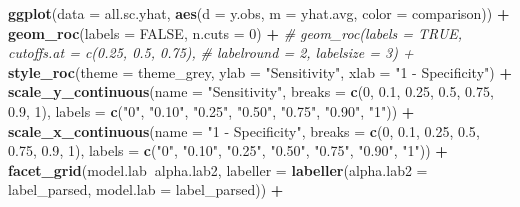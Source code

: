 \documentclass[
]{article}
\newenvironment{Shaded}{\begin{snugshade}}{\end{snugshade}}
\newcommand{\CommentTok}[1]{\textcolor[rgb]{0.56,0.35,0.01}{\textit{#1}}}
\newcommand{\DataTypeTok}[1]{\textcolor[rgb]{0.13,0.29,0.53}{#1}}
\newcommand{\DecValTok}[1]{\textcolor[rgb]{0.00,0.00,0.81}{#1}}
\newcommand{\FloatTok}[1]{\textcolor[rgb]{0.00,0.00,0.81}{#1}}
\newcommand{\KeywordTok}[1]{\textcolor[rgb]{0.13,0.29,0.53}{\textbf{#1}}}
\newcommand{\NormalTok}[1]{#1}
\newcommand{\OperatorTok}[1]{\textcolor[rgb]{0.81,0.36,0.00}{\textbf{#1}}}
\newcommand{\OtherTok}[1]{\textcolor[rgb]{0.56,0.35,0.01}{#1}}
\newcommand{\StringTok}[1]{\textcolor[rgb]{0.31,0.60,0.02}{#1}}
\begin{document}
\begin{Shaded}
\begin{Highlighting}[]
\KeywordTok{ggplot}\NormalTok{(}\DataTypeTok{data =}\NormalTok{ all.sc.yhat, }\KeywordTok{aes}\NormalTok{(}\DataTypeTok{d =}\NormalTok{ y.obs, }\DataTypeTok{m =}\NormalTok{ yhat.avg, }\DataTypeTok{color =}\NormalTok{ comparison)) }\OperatorTok{+}
\StringTok{  }\KeywordTok{geom_roc}\NormalTok{(}\DataTypeTok{labels =} \OtherTok{FALSE}\NormalTok{, }\DataTypeTok{n.cuts =} \DecValTok{0}\NormalTok{) }\OperatorTok{+}
\StringTok{  }\CommentTok{# geom_roc(labels = TRUE, cutoffs.at = c(0.25, 0.5, 0.75),}
\StringTok{  }\CommentTok{#          labelround = 2, labelsize = 3) +}
\StringTok{  }\KeywordTok{style_roc}\NormalTok{(}\DataTypeTok{theme =}\NormalTok{ theme_grey,}
            \DataTypeTok{ylab =} \StringTok{"Sensitivity"}\NormalTok{, }\DataTypeTok{xlab =} \StringTok{"1 - Specificity"}\NormalTok{) }\OperatorTok{+}
\StringTok{  }\KeywordTok{scale_y_continuous}\NormalTok{(}\DataTypeTok{name =} \StringTok{"Sensitivity"}\NormalTok{,}
                     \DataTypeTok{breaks =} \KeywordTok{c}\NormalTok{(}\DecValTok{0}\NormalTok{, }\FloatTok{0.1}\NormalTok{, }\FloatTok{0.25}\NormalTok{, }\FloatTok{0.5}\NormalTok{, }\FloatTok{0.75}\NormalTok{, }\FloatTok{0.9}\NormalTok{, }\DecValTok{1}\NormalTok{),}
                     \DataTypeTok{labels =} \KeywordTok{c}\NormalTok{(}\StringTok{"0"}\NormalTok{, }\StringTok{"0.10"}\NormalTok{, }\StringTok{"0.25"}\NormalTok{, }\StringTok{"0.50"}\NormalTok{, }\StringTok{"0.75"}\NormalTok{, }\StringTok{"0.90"}\NormalTok{, }\StringTok{"1"}\NormalTok{)) }\OperatorTok{+}
\StringTok{  }\KeywordTok{scale_x_continuous}\NormalTok{(}\DataTypeTok{name =} \StringTok{"1 - Specificity"}\NormalTok{,}
                     \DataTypeTok{breaks =} \KeywordTok{c}\NormalTok{(}\DecValTok{0}\NormalTok{, }\FloatTok{0.1}\NormalTok{, }\FloatTok{0.25}\NormalTok{, }\FloatTok{0.5}\NormalTok{, }\FloatTok{0.75}\NormalTok{, }\FloatTok{0.9}\NormalTok{, }\DecValTok{1}\NormalTok{),}
                     \DataTypeTok{labels =} \KeywordTok{c}\NormalTok{(}\StringTok{"0"}\NormalTok{, }\StringTok{"0.10"}\NormalTok{, }\StringTok{"0.25"}\NormalTok{, }\StringTok{"0.50"}\NormalTok{, }\StringTok{"0.75"}\NormalTok{, }\StringTok{"0.90"}\NormalTok{, }\StringTok{"1"}\NormalTok{)) }\OperatorTok{+}
\StringTok{  }\KeywordTok{facet_grid}\NormalTok{(model.lab}\OperatorTok{~}\NormalTok{alpha.lab2, }\DataTypeTok{labeller =} \KeywordTok{labeller}\NormalTok{(}\DataTypeTok{alpha.lab2 =}\NormalTok{ label_parsed,}
                                                       \DataTypeTok{model.lab =}\NormalTok{ label_parsed)) }\OperatorTok{+}

\end{Highlighting}
\end{Shaded}
\end{document}
